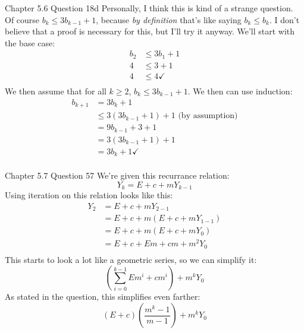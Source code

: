 \documentclass[11pt]{article}
\begin{document}
    \begin{problem}{Chapter 5.6 Question 18d}
        Personally, I think this is kind of a strange question. Of course $b_k \leq 3b_{k-1} + 1$,
        because \textit{by definition} that's like saying $b_k \leq b_k$. I don't believe that a
        proof is necessary for this, but I'll try it anyway. We'll start with the base case:
        \begin{equation*}
            \begin{split}
                b_2 & \leq 3b_1 + 1 \\
                4 & \leq 3 + 1 \\
                4 & \leq 4 \checkmark \\
            \end{split}
        \end{equation*}
        We then assume that for all $k \geq 2$, $b_k \leq 3b_{k-1} + 1$. We then can use induction:
        \begin{equation*}
            \begin{split}
                b_{k+1} & = 3b_k + 1 \\
                & \leq 3(3b_{k-1} + 1) + 1 \text{ (by assumption)} \\
                & = 9b_{k-1} + 3 + 1 \\
                & = 3(3b_{k-1} + 1) + 1 \\
                & = 3b_k + 1 \checkmark \\
            \end{split}
        \end{equation*}
    \end{problem}

    \begin{problem}{Chapter 5.7 Question 57}
        We're given this recurrance relation:
        \[Y_k = E + c + mY_{k-1}\]
        Using iteration on this relation looks like this:
        \begin{equation*}
            \begin{split}
                Y_2 & = E + c + mY_{2-1} \\
                & = E + c + m(E + c + mY_{1-1}) \\
                & = E + c + m(E + c + mY_0) \\
                & = E + c + Em + cm + m^2Y_0 \\
            \end{split}
        \end{equation*}
        This starts to look a lot like a geometric series, so we can simplify it:
        \[(\sum_{i=0}^{k-1} Em^i + cm^i) + m^{k}Y_0\]
        As stated in the question, this simplifies even farther:
        \[(E + c)(\frac{m^k - 1}{m - 1}) + m^{k}Y_0\]
    \end{problem}
\end{document}
